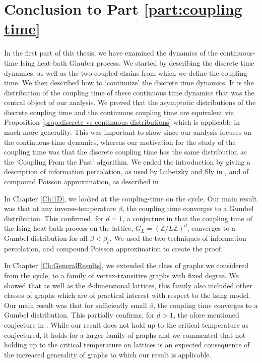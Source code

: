 \chapter{Conclusion to Part \ref{part:coupling time}}
\label{Ch:CouplingConclusion}


In the first part of this thesis, we have examined the dynamics of the continuous-time Ising heat-bath Glauber process. We started by describing the discrete time dynamics, as well as the two coupled chains from which we define the coupling time. We then described how to `continuize' the discrete time dynamics. It is the distribution of the coupling time of these continuous time dynamics that was the central object of our analysis. We proved that the asymptotic distributions of the discrete coupling time and the continuous coupling time are equivalent via Proposition \ref{prop:discrete vs continuous distributions} which is applicable in much more generality. This was important to show since our analysis focuses on the continuous-time dynamics, whereas our motivation for the study of the coupling time was that the discrete coupling time has the same distribution as the `Coupling From the Past' algorithm. We ended the introduction by giving a description of information percolation, as used by Lubetzky and Sly in \cite{Lubetzky2016-wd}, and of compound Poisson approximation, as described in \cite{Barbour2001-nh}.

In Chapter \ref{Ch:1D}, we looked at the coupling-time on the cycle. Our main result was that at any inverse-temperature $\beta$, the coupling time converges to a Gumbel distribution. This confirmed, for $d = 1$, a conjecture in \cite[Conjecture 7.1]{Collevecchio2018-nq} that the coupling time of the Ising heat-bath process on the lattice, $G_L = (\mathbb{Z} / L \mathbb{Z})^d$, converges to a Gumbel distribution for all $\beta < \beta_c$. We used the two techniques of information percolation, and compound Poisson approximation to create the proof.

In Chapter \ref{Ch:GeneralResults}, we extended the class of graphs we considered from the cycle, to a family of vertex-transitive graphs with fixed degree. We showed that as well as the $d$-dimensional lattices, this family also included other classes of graphs which are of practical interest with respect to the Ising model. Our main result was that for sufficiently small $\beta$, the coupling time converges to a Gumbel distribution. This partially confirms, for $d > 1$, the afore mentioned conjecture in \cite{Collevecchio2018-nq}. While our result does not hold up to the critical temperature as conjectured, it holds for a larger family of graphs and we commented that not holding up to the critical temperature on lattices is an expected consequence of the increased generality of graphs to which our result is applicable.

